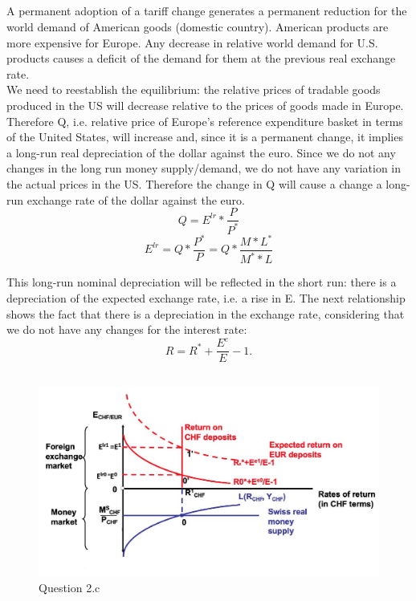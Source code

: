 \documentclass[	11pt, ]{fphw}
\begin{document}
\subsection{} 
A permanent adoption of a tariff change generates a permanent reduction for the world demand of American goods (domestic country). American products
are more expensive for Europe. Any decrease in relative world demand for U.S. products
causes a deficit of the demand for them at the previous real exchange
rate. \\
We need to reestablish the equilibrium: the relative prices of tradable goods produced in the US will decrease relative to the prices of goods made in Europe. 
Therefore Q, i.e. relative price of Europe’s reference expenditure basket in terms of the United States, will increase and, since it is a permanent change, it implies a long-run
real depreciation of the dollar against the euro. Since we do not any
changes in the long run money supply/demand, we do not have any
variation in the actual prices in the US. Therefore the change in Q will cause a change a long-run exchange rate of the dollar against the euro. 
\[ Q=E^{lr}*\frac{P}{P^{*}}\]
\[ E^{lr}=Q*\frac{P^{*}}{P}= Q*\frac{M*L^{*}}{ M^{*}*L}\]

This long-run nominal depreciation will be reflected in the short run: there is a depreciation of the expected exchange rate, i.e. a rise in E. The next relationship shows the fact that there is a depreciation in the exchange rate, considering that we do not have any changes for the interest rate:
\[R=R^{*}+\frac{E^{e}}{E}-1.\]

\newpage
\subsection{}
\begin{figure}[h!] 
\centering 
\includegraphics[scale=0.65]{6.JPG} 
\caption{Question 2.c} 
\label{5k}
\end{figure}
\end{document}
